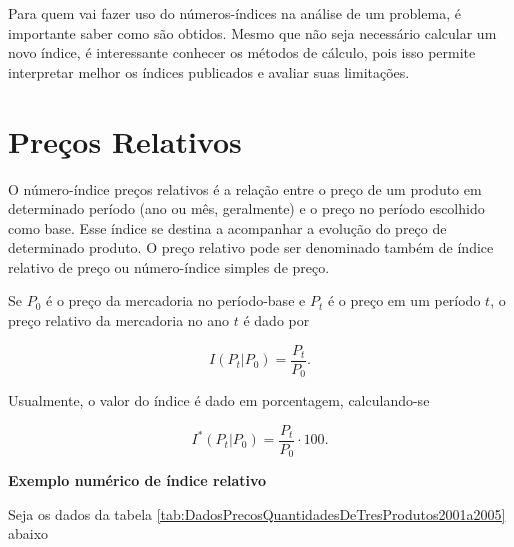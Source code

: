 \documentclass[
]{book}
\begin{document}
Para quem vai fazer uso do números-índices na análise de um problema, é
importante saber como são obtidos. Mesmo que não seja necessário calcular um
novo índice, é interessante conhecer os métodos de cálculo, pois isso permite
interpretar melhor os índices publicados e avaliar suas limitações.

\hypertarget{preuxe7os-relativos}{%
\section{Preços Relativos}\label{preuxe7os-relativos}}

O número-índice preços relativos é a relação entre o preço de um produto em determinado período (ano ou mês, geralmente) e o preço no período escolhido como base. Esse índice se destina a acompanhar a evolução do preço de determinado produto. O preço relativo pode ser denominado também de índice relativo de preço ou número-índice simples de preço.

Se \(P_0\) é o preço da mercadoria no período-base e \(P_t\) é o preço em um período \(t\), o preço relativo da mercadoria no ano \(t\) é dado por

\begin{equation}
  I(P_t| P_0) = \frac{P_t}{P_0}.
  \label{eq:IndicePrecoRelativo}
\end{equation}

Usualmente, o valor do índice é dado em porcentagem, calculando-se

\begin{equation}
  I^*(P_t| P_0) = \frac{P_t}{P_0}\cdot 100.
  \label{eq:IndicePrecoRelativoPorcentagem}
\end{equation}

\textbf{Exemplo numérico de índice relativo}

Seja os dados da tabela \ref{tab:DadosPrecosQuantidadesDeTresProdutos2001a2005} abaixo
\end{document}
